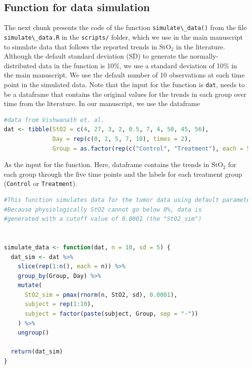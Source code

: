 \documentclass[
]{article}
\newcommand{\passthrough}[1]{#1}
\begin{document}
\hypertarget{function-for-data-simulation}{%
\subsection{Function for data simulation}\label{function-for-data-simulation}}

The next chunk presents the code of the function \passthrough{\lstinline!simulate\_data()!} from the file \passthrough{\lstinline!simulate\_data.R!} in the \passthrough{\lstinline!scripts/!} folder, which we use in the main manuscript to simulate data that follows the reported trends in \(\mbox{StO}_2\) in the literature. Although the default standard deviation (SD) to generate the normally-distributed data in the function is 10\%, we use a standard deviation of 10\% in the main manuscript. We use the default number of 10 observations at each time point in the simulated data. Note that the input for the function is \passthrough{\lstinline!dat!}, needs to be a dataframe that contains the original values for the trends in each group over time from the literature. In our manuscript, we use the dataframe

\begin{lstlisting}[language=R]
#data from Vishwanath et. al.
dat <- tibble(StO2 = c(4, 27, 3, 2, 0.5, 7, 4, 50, 45, 56),
              Day = rep(c(0, 2, 5, 7, 10), times = 2),
              Group = as.factor(rep(c("Control", "Treatment"), each = 5)))
\end{lstlisting}

As the input for the function. Here, dataframe contains the trends in \(\mbox{StO}_2\) for each group through the five time points and the labels for each treatment group (\passthrough{\lstinline!Control!} or \passthrough{\lstinline!Treatment!}).

\begin{lstlisting}[language=R]
#This function simulates data for the tumor data using default parameters of 10 observations per time point,and Standard deviation (sd) of 5%.
#Because physiologically StO2 cannot go below 0%, data is
#generated with a cutoff value of 0.0001 (the "StO2_sim")


simulate_data <- function(dat, n = 10, sd = 5) {
  dat_sim <- dat %>%
    slice(rep(1:n(), each = n)) %>%
    group_by(Group, Day) %>%
    mutate(
      StO2_sim = pmax(rnorm(n, StO2, sd), 0.0001),
      subject = rep(1:10),
      subject = factor(paste(subject, Group, sep = "-"))
    ) %>%
    ungroup()
  
  return(dat_sim)
}
\end{lstlisting}
\end{document}
